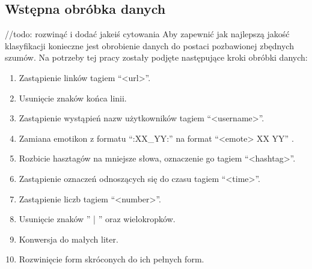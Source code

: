 \subsection{Wstępna obróbka danych}
//todo: rozwinąć i dodać jakeiś cytowania
Aby zapewnić jak najlepszą jakość klasyfikacji konieczne jest obrobienie danych do postaci pozbawionej zbędnych szumów. Na potrzeby tej pracy zostały podjęte następujące kroki obróbki danych:


\begin{enumerate}
    \item Zastąpienie linków tagiem “<url>”.
    \item Usunięcie znaków końca linii.
    \item Zastąpienie wystąpień nazw użytkowników tagiem  “<username>”.
    \item Zamiana emotikon z formatu “:XX\_YY:” na format “<emote> XX YY” .
    \item Rozbicie hasztagów na mniejsze słowa, oznaczenie go tagiem “<hashtag>”.
    \item Zastąpienie oznaczeń odnoszących się do czasu tagiem “<time>”.
    \item Zastąpienie liczb tagiem “<number>”.
    \item Usunięcie znaków  '' | ''  oraz wielokropków.
    \item Konwersja do małych liter.
    \item Rozwinięcie form skróconych do ich pełnych form.
\end{enumerate}

